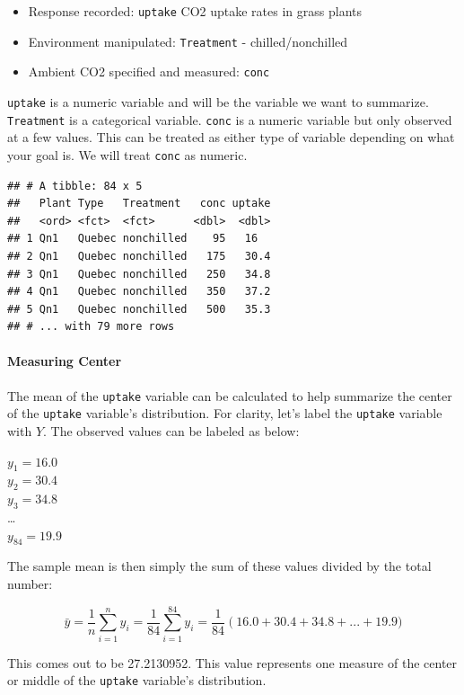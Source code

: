 \documentclass[
]{book}
\providecommand{\tightlist}{%
  \setlength{\itemsep}{0pt}\setlength{\parskip}{0pt}}
\let\oldparagraph\paragraph
\renewcommand{\paragraph}[1]{\oldparagraph{#1}\mbox{}}
\theoremstyle{definition}
\theoremstyle{definition}
\theoremstyle{definition}
\theoremstyle{remark}
\begin{document}
\begin{itemize}
\tightlist
\item
  Response recorded: \texttt{uptake} CO2 uptake rates in grass plants\\
\item
  Environment manipulated: \texttt{Treatment} - chilled/nonchilled\\
\item
  Ambient CO2 specified and measured: \texttt{conc}
\end{itemize}

\texttt{uptake} is a numeric variable and will be the variable we want to summarize. \texttt{Treatment} is a categorical variable. \texttt{conc} is a numeric variable but only observed at a few values. This can be treated as either type of variable depending on what your goal is. We will treat \texttt{conc} as numeric.

\begin{verbatim}
## # A tibble: 84 x 5
##   Plant Type   Treatment   conc uptake
##   <ord> <fct>  <fct>      <dbl>  <dbl>
## 1 Qn1   Quebec nonchilled    95   16  
## 2 Qn1   Quebec nonchilled   175   30.4
## 3 Qn1   Quebec nonchilled   250   34.8
## 4 Qn1   Quebec nonchilled   350   37.2
## 5 Qn1   Quebec nonchilled   500   35.3
## # ... with 79 more rows
\end{verbatim}

\hypertarget{measuring-center}{%
\paragraph{Measuring Center}\label{measuring-center}}

The mean of the \texttt{uptake} variable can be calculated to help summarize the center of the \texttt{uptake} variable's distribution. For clarity, let's label the \texttt{uptake} variable with \(Y\). The observed values can be labeled as below:

\(y_1 = 16.0\)\\
\(y_2 = 30.4\)\\
\(y_3 = 34.8\)\\
\ldots{}\\
\(y_{84} = 19.9\)

The sample mean is then simply the sum of these values divided by the total number:

\[\bar{y} = \frac{1}{n} \sum_{i=1}^{n} y_i = \frac{1}{84}\sum_{i=1}^{84}y_i = \frac{1}{84}\left(16.0 + 30.4 + 34.8 + ... + 19.9)\]

This comes out to be 27.2130952. This value represents one measure of the center or middle of the \texttt{uptake} variable's distribution.
\end{document}
